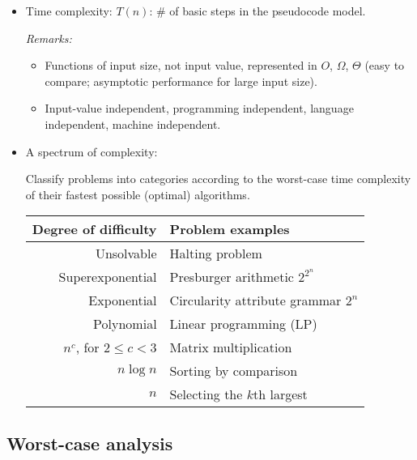\documentclass{article}
\begin{document}
\begin{itemize}
\item Time complexity: $T(n)$: \# of basic steps in the pseudocode model.

{\em Remarks:}
\begin{itemize}
\item Functions of input size, not input value, represented in $O$, $\Omega$,
$\Theta$ (easy to compare; asymptotic performance for large input size).
\item Input-value independent, programming independent, language independent,
machine independent.
\end{itemize}

\item A spectrum of complexity:

Classify problems into categories according to the worst-case time
complexity of their fastest possible (optimal) algorithms.

\begin{center}
\begin{tabular}{r|l}
Degree of difficulty & Problem examples\\\hline\hline
Unsolvable & Halting problem\\\hline
Superexponential & Presburger arithmetic $2^{2^n}$\\
Exponential & Circularity attribute grammar $2^n$\\\hline
Polynomial & Linear programming (LP)\\
$n^c$, for $2\le c<3$ & Matrix multiplication\\
$n\log n$ & Sorting by comparison\\
$n$ & Selecting the $k$th largest
\end{tabular}
\end{center}

\end{itemize}

\subsection{Worst-case analysis}

\end{document}
